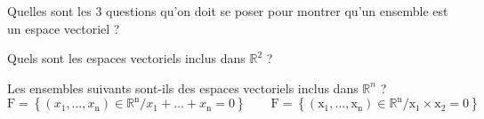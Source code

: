 Quelles sont les $3$ questions qu'on doit se poser pour montrer qu'un ensemble est un espace vectoriel ?

\vspace{1em}

Quels sont les espaces vectoriels inclus dans $\mathbb{R}^2$ ? 

\vspace{2em}

Les ensembles suivants sont-ils des espaces vectoriels inclus dans $\mathbb{R}^n$ ? 
$$ \mathrm{F}=\left\{\left(x_1, \ldots, x_{\mathrm{n}}\right) \in \mathbb{R}^{\mathrm{n}} / x_1+\ldots+x_{\mathrm{n}}=0\right\} \qquad 
    \mathrm{F}=\left\{\left(\mathrm{x}_1, \ldots, \mathrm{x}_{\mathrm{n}}\right) \in \mathbb{R}^{\mathrm{n}} / \mathrm{x}_1 \times \mathrm{x}_2=0\right\}
    $$